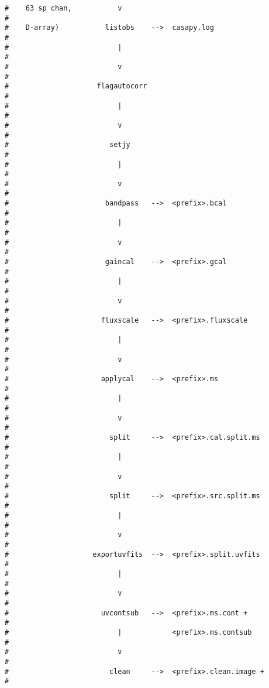 \begin{verbatim}
#    63 sp chan,           v                                             #
#    D-array)           listobs    -->  casapy.log                       #
#                          |                                             #
#                          v                                             #
#                     flagautocorr                                       #
#                          |                                             #
#                          v                                             #
#                        setjy                                           #
#                          |                                             #
#                          v                                             #
#                       bandpass   -->  <prefix>.bcal                    #
#                          |                                             #
#                          v                                             #
#                       gaincal    -->  <prefix>.gcal                    #
#                          |                                             #
#                          v                                             #
#                      fluxscale   -->  <prefix>.fluxscale               #
#                          |                                             #
#                          v                                             #
#                      applycal    -->  <prefix>.ms                      #
#                          |                                             #
#                          v                                             #
#                        split     -->  <prefix>.cal.split.ms            #
#                          |                                             #
#                          v                                             #
#                        split     -->  <prefix>.src.split.ms            #
#                          |                                             #
#                          v                                             #
#                    exportuvfits  -->  <prefix>.split.uvfits            #
#                          |                                             #
#                          v                                             #
#                      uvcontsub   -->  <prefix>.ms.cont +               #
#                          |            <prefix>.ms.contsub              #
#                          v                                             #
#                        clean     -->  <prefix>.clean.image +           #

\end{verbatim}

